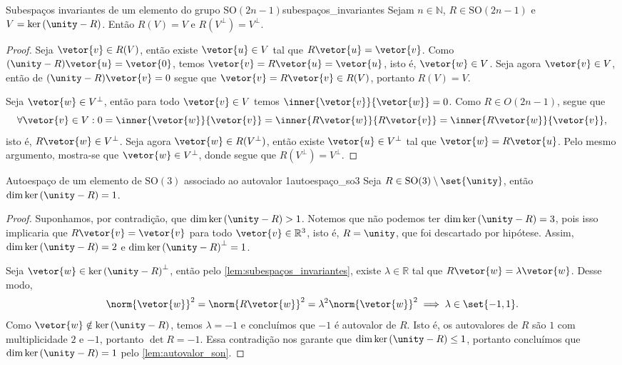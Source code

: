 \begin{lemma}{Subespaços invariantes de um elemento do grupo \(\mathrm{SO}(2n-1)\)}{subespaços_invariantes}
    Sejam \(n \in \mathbb{N}\), \(R \in \mathrm{SO}(2n-1)\) e \(V = \ker{(\unity - R)}\). Então \(R(V) = V\) e \(R(V^\perp) = V^\perp\).
\end{lemma}
\begin{proof}
    Seja \(\vetor{v} \in R(V)\), então existe \(\vetor{u} \in V\) tal que \(R\vetor{u} = \vetor{v}\). Como \((\unity - R)\vetor{u} = \vetor{0}\), temos \(\vetor{v} = R\vetor{u} = \vetor{u}\), isto é, \(\vetor{w} \in V\). Seja agora \(\vetor{v} \in V\), então de \((\unity - R)\vetor{v} = 0\) segue que \(\vetor{v} = R\vetor{v} \in R(V)\), portanto \(R(V) = V\).

    Seja \(\vetor{w} \in V^\perp\), então para todo \(\vetor{v} \in V\) temos \(\inner{\vetor{v}}{\vetor{w}} = 0\). Como \(R \in O(2n - 1)\), segue que
    \begin{equation*}
        \forall \vetor{v} \in V : 0 = \inner{\vetor{w}}{\vetor{v}} = \inner{R\vetor{w}}{R\vetor{v}} = \inner{R\vetor{w}}{\vetor{v}},
    \end{equation*}
    isto é, \(R\vetor{w} \in V^\perp\). Seja agora \(\vetor{w} \in R(V^\perp)\), então existe \(\vetor{u} \in V^\perp\) tal que \(\vetor{w} = R\vetor{u}\). Pelo mesmo argumento, mostra-se que \(\vetor{w} \in V^\perp\), donde segue que \(R(V^\perp) = V^\perp\).
\end{proof}
\begin{proposition}{Autoespaço de um elemento de \(\mathrm{SO}(3)\) associado ao autovalor 1}{autoespaço_so3}
    Seja \(R \in \mathrm{SO}(3) \setminus \set{\unity}\), então \(\dim\ker{(\unity - R)} = 1\).
\end{proposition}
\begin{proof}
    Suponhamos, por contradição, que \(\dim\ker{(\unity - R)} > 1\). Notemos que não podemos ter \(\dim\ker{(\unity - R)} = 3\), pois isso implicaria que \(R\vetor{v} = \vetor{v}\) para todo \(\vetor{v} \in \mathbb{R}^3\), isto é, \(R = \unity\), que foi descartado por hipótese. Assim, \(\dim\ker{(\unity - R)} = 2\) e \(\dim{\ker{(\unity - R)}^\perp} = 1\).

    Seja \(\vetor{w} \in \ker{(\unity - R)}^\perp\), então pelo \cref{lem:subespaços_invariantes}, existe \(\lambda \in \mathbb{R}\) tal que \(R\vetor{w} = \lambda \vetor{w}\). Desse modo,
    \begin{equation*}
        \norm{\vetor{w}}^2 = \norm{R\vetor{w}}^2 = \lambda^2\norm{\vetor{w}}^2 \implies \lambda \in \set{-1,1}.
    \end{equation*}
    Como \(\vetor{w} \notin \ker{(\unity - R)}\), temos \(\lambda = -1\) e concluímos que \(-1\) é autovalor de \(R\). Isto é, os autovalores de \(R\) são \(1\) com multiplicidade \(2\) e \(-1\), portanto \(\det{R} = -1\). Essa contradição nos garante que \(\dim\ker{(\unity - R)} \leq 1\), portanto concluímos que \(\dim\ker{(\unity - R)} = 1\) pelo \cref{lem:autovalor_son}.
\end{proof}

